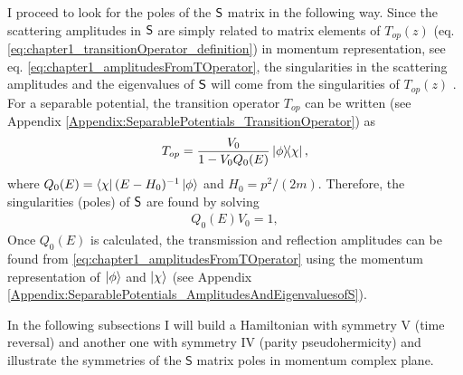 I proceed to look for the poles of the ${\sf S}$ matrix in the following way. Since the scattering amplitudes in ${\sf S}$ are simply related to matrix elements of $T_{op}(z)$ (eq. \eqref{eq:chapter1_transitionOperator_definition}) in momentum representation, see eq. \eqref{eq:chapter1_amplitudesFromTOperator}, the singularities in the scattering amplitudes and the eigenvalues of ${\sf S}$ will come from the singularities of $T_{op}(z)$ \cite{Muga1996}. For a separable potential, the transition operator $T_{op}$ can be written (see Appendix \ref{Appendix:SeparablePotentials_TransitionOperator}) as
%
\begin{equation}
	T_{op}=\frac{V_{0}}{1-V_{0} Q_{0}(E)} \ketbra{\phi}{\chi},
  \label{eq:chapter2_TransitionOperatorSeparablePotential}
\end{equation}
%
where $Q_{0}(E)=\bra{\chi}(E-H_0)^{-1}\ket{\phi}$ and $H_{0}=p^{2}/(2m)$. Therefore, the singularities (poles) of ${\sf S}$ are found by solving
%
\begin{eqnarray}
	Q_{0}(E)V_{0} = 1,
	\label{eq:chapter2_roots}
\end{eqnarray}
%
Once $Q_{0}(E)$  is calculated, the transmission and reflection amplitudes can be found from \eqref{eq:chapter1_amplitudesFromTOperator} using the momentum representation of $\ket{\phi}$ and $\ket{\chi}$ (see Appendix \ref{Appendix:SeparablePotentials_AmplitudesAndEigenvaluesofS}).

In the following subsections I will build a Hamiltonian with symmetry V (time reversal) and another one with symmetry IV (parity pseudohermicity) and illustrate the symmetries of the $\mathsf{S}$ matrix poles in momentum complex plane.
%

